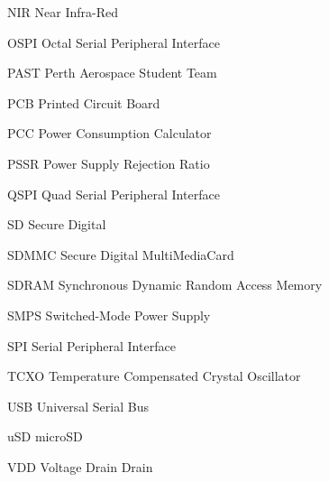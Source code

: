 \begin{abbreviations}
\item[NIR] Near Infra-Red
\item[OSPI] Octal Serial Peripheral Interface
\item[PAST] Perth Aerospace Student Team
\item[PCB] Printed Circuit Board
\item[PCC] Power Consumption Calculator
\item[PSSR] Power Supply Rejection Ratio
\item[QSPI] Quad Serial Peripheral Interface
\item[SD] Secure Digital
\item[SDMMC] Secure Digital MultiMediaCard
\item[SDRAM] Synchronous Dynamic Random Access Memory 
\item[SMPS] Switched-Mode Power Supply
\item[SPI] Serial Peripheral Interface
\item[TCXO] Temperature Compensated Crystal Oscillator
\item[USB] Universal Serial Bus
\item[uSD] microSD 
\item[VDD] Voltage Drain Drain
\end{abbreviations}